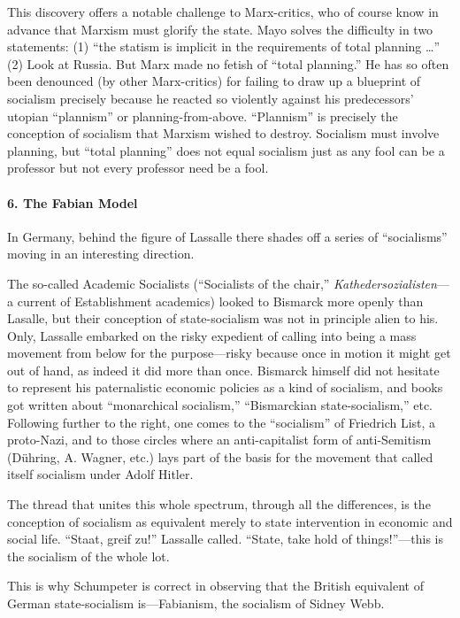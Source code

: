 This discovery offers a notable challenge to Marx-critics, who of course know in advance that Marxism must glorify the state. Mayo solves the difficulty in two statements: (1) ``the statism is implicit in the requirements of total planning \ldots'' (2) Look at Russia. But Marx made no fetish of ``total planning.'' He has so often been denounced (by other Marx-critics) for failing to draw up a blueprint of socialism precisely because he reacted so violently against his predecessors' utopian ``plannism'' or planning-from-above. ``Plannism'' is precisely the conception of socialism that Marxism wished to destroy. Socialism must involve planning, but ``total planning'' does not equal socialism just as any fool can be a professor but not every professor need be a fool.

\paragraph{6. The Fabian Model}

In Germany, behind the figure of Lassalle there shades off a series of ``socialisms'' moving in an interesting direction.

The so-called Academic Socialists (``Socialists of the chair,'' \emph{Kathedersozialisten}---a current of Establishment academics) looked to Bismarck more openly than Lasalle, but their conception of state-socialism was not in principle alien to his. Only, Lassalle embarked on the risky expedient of calling into being a mass movement from below for the purpose---risky because once in motion it might get out of hand, as indeed it did more than once. Bismarck himself did not hesitate to represent his paternalistic economic policies as a kind of socialism, and books got written about ``monarchical socialism,'' ``Bismarckian state-socialism,'' etc. Following further to the right, one comes to the ``socialism'' of Friedrich List, a proto-Nazi, and to those circles where an anti-capitalist form of anti-Semitism (D\"{u}hring, A. Wagner, etc.) lays part of the basis for the movement that called itself socialism under Adolf Hitler.

The thread that unites this whole spectrum, through all the differences, is the conception of socialism as equivalent merely to state intervention in economic and social life. ``Staat, greif zu!'' Lassalle called. ``State, take hold of things!''---this is the socialism of the whole lot.

This is why Schumpeter is correct in observing that the British equivalent of German state-socialism is---Fabianism, the socialism of Sidney Webb.

